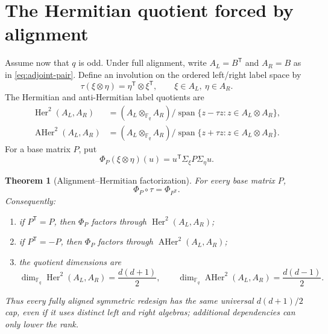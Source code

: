 \documentclass[11pt]{article}
\newtheorem{theorem}{Theorem}[section]
\newcommand{\F}{\mathbb F}
\newcommand{\Span}{\operatorname{span}}
\newcommand{\transpose}{\mathsf T}
\begin{document}
\section{The Hermitian quotient forced by alignment}
\label{sec:alignment-hermitian}

Assume now that $q$ is odd.  Under full alignment, write
$A_L=B^\transpose$ and $A_R=B$ as in \eqref{eq:adjoint-pair}.  Define an
involution on the ordered left/right label space by
\begin{equation}
 \tau(\xi\otimes\eta)
   =\eta^\transpose\otimes\xi^\transpose,
 \qquad
 \xi\in A_L,\ \eta\in A_R.                         \label{eq:twisted-label-involution}
\end{equation}
The Hermitian and anti-Hermitian label quotients are
\begin{align}
 \operatorname{Her}^2(A_L,A_R)
   &= (A_L\otimes_{\F_q}A_R)/
      \Span\{z-\tau z:z\in A_L\otimes A_R\},       \label{eq:hermitian-square}\\
 \operatorname{AHer}^2(A_L,A_R)
   &= (A_L\otimes_{\F_q}A_R)/
      \Span\{z+\tau z:z\in A_L\otimes A_R\}.       \label{eq:antihermitian-square}
\end{align}
For a base matrix $P$, put
\[
 \Phi_P(\xi\otimes\eta)(u)
   =u^\transpose\Sigma_\xi P\Sigma_\eta u.
\]

\begin{theorem}[Alignment--Hermitian factorization]
\label{thm:alignment-hermitian-factorization}
For every base matrix $P$,
\begin{equation}
  \Phi_P\circ\tau=\Phi_{P^\transpose}.              \label{eq:transpose-intertwining}
\end{equation}
Consequently:
\begin{enumerate}[label=(\roman*)]
\item if $P^\transpose=P$, then $\Phi_P$ factors through
      $\operatorname{Her}^2(A_L,A_R)$;
\item if $P^\transpose=-P$, then $\Phi_P$ factors through
      $\operatorname{AHer}^2(A_L,A_R)$;
\item the quotient dimensions are
\begin{equation}
 \dim_{\F_q}\operatorname{Her}^2(A_L,A_R)
      =\frac{d(d+1)}2,
 \qquad
 \dim_{\F_q}\operatorname{AHer}^2(A_L,A_R)
      =\frac{d(d-1)}2.                              \label{eq:hermitian-dimensions}
\end{equation}
\end{enumerate}
Thus every fully aligned symmetric redesign has the same universal
$d(d+1)/2$ cap, even if it uses distinct left and right algebras; additional
dependencies can only lower the rank.
\end{theorem}
\end{document}
